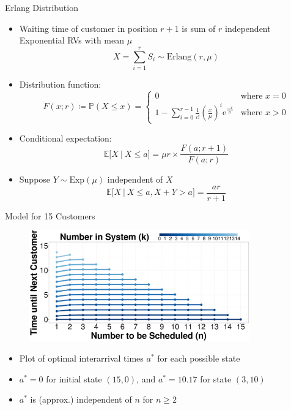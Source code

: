 \documentclass{beamer}
\begin{document}
\begin{frame}{Erlang Distribution}
	\begin{itemize}
		\item Waiting time of customer in position $r + 1$ is sum of $r$ independent Exponential RVs with mean $\mu$
		\begin{equation*}
		 	X = \sum_{i = 1}^{r} S_{i} \sim \text{Erlang} (r, \mu)
		\end{equation*}
		\item Distribution function:
		\begin{equation*}
			F (x; r) \coloneqq \mathbb{P} (X \leq x) = \begin{cases} 0 & \text{where $x = 0$} \\ \displaystyle 1 - \sum_{i = 0}^{r - 1} \frac{1}{i!} \left( \frac{x}{\mu} \right)^{i} \mathrm{e}^{\frac{-x}{\mu}} & \text{where $x > 0$} \end{cases}
		\end{equation*}
		\item Conditional expectation:
		\begin{equation*}
			\mathbb{E} \Big[ X \ \big| \ X \leq a \Big] = \mu r \times \frac{F (a; r + 1)}{F (a; r)}
		\end{equation*}
		\item Suppose $Y \sim \text{Exp} (\mu)$ independent of $X$ 
		\begin{equation*}
			\mathbb{E} \Big[ X \ \big| \ X \leq a, X + Y > a \Big] = \frac{a r}{r + 1}
		\end{equation*}
	\end{itemize}
\end{frame}

\begin{frame}{Model for 15 Customers}
	\begin{figure}
		\centering
		\includegraphics[width=0.85\textwidth]{Dynamic_Line_Interarrival_k.eps}
	\end{figure}

	\begin{itemize}
		\item Plot of optimal interarrival times $a^{*}$ for each possible state
		\item $a^{*} = 0$ for initial state $(15, 0)$, and $a^{*} = 10.17$ for state $(3, 10)$
		\item $a^{*}$ is (approx.) independent of $n$ for $n \geq 2$
	\end{itemize}
\end{frame}
\end{document}

